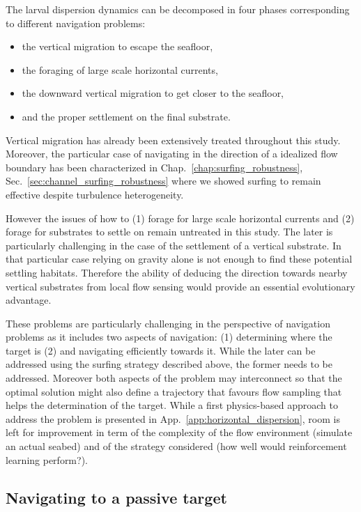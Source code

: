 The larval dispersion dynamics can be decomposed in four phases corresponding to different navigation problems:
\begin{itemize}
	\item the vertical migration to escape the seafloor,
	\item the foraging of large scale horizontal currents,
	\item the downward vertical migration to get closer to the seafloor,
	\item and the proper settlement on the final substrate.
\end{itemize}
Vertical migration has already been extensively treated throughout this study.
Moreover, the particular case of navigating in the direction of a idealized flow boundary has been characterized in Chap.~\ref{chap:surfing_robustness}, Sec.~\ref{sec:channel_surfing_robustness} where we showed surfing to remain effective despite turbulence heterogeneity.

However the issues of how to (1) forage for large scale horizontal currents and (2) forage for substrates to settle on remain untreated in this study.
The later is particularly challenging in the case of the settlement of a vertical substrate.
In that particular case relying on gravity alone is not enough to find these potential settling habitats.
Therefore the ability of deducing the direction towards nearby vertical substrates from local flow sensing would provide an essential evolutionary advantage.

These problems are particularly challenging in the perspective of navigation problems as it includes two aspects of navigation: (1) determining where the target is (2) and navigating efficiently towards it.
While the later can be addressed using the surfing strategy described above, the former needs to be addressed.
Moreover both aspects of the problem may interconnect so that the optimal solution might also define a trajectory that favours flow sampling that helps the determination of the target.
While a first physics-based approach to address the problem is presented in App.~\ref{app:horizontal_dispersion}, room is left for improvement in term of the complexity of the flow environment (simulate an actual seabed) and of the strategy considered (how well would reinforcement learning perform?).

\subsection{Navigating to a passive target}\label{sec:navigating_passive_target}

